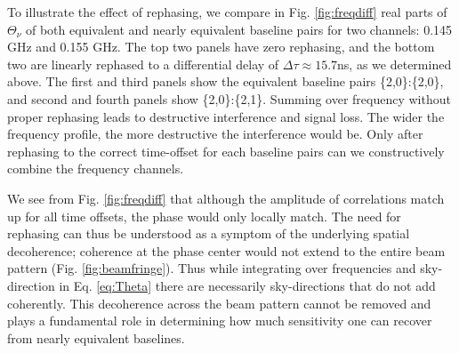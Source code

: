 \documentclass[twocolumn,apj,numberedappendix]{emulateapj}
\renewcommand\[{\begin{equation}}
\renewcommand\]{\end{equation}}
\begin{document}
To illustrate the effect of rephasing, we compare in Fig. \ref{fig:freqdiff} real parts of $\Theta_{\nu}$ of both equivalent and nearly equivalent baseline pairs for two channels: 0.145 GHz and 0.155 GHz. The top two panels have zero rephasing, and the bottom two are linearly rephased to a differential delay of $\Delta\tau\approx15.7$ns, as we determined above. The first and third panels show the equivalent baseline pairs \{2,0\}:\{2,0\}, and second and fourth panels show \{2,0\}:\{2,1\}. Summing over frequency without proper rephasing leads to destructive interference and signal loss. The wider the frequency profile, the more destructive the interference would be. Only after rephasing to the correct time-offset for each baseline pairs can we constructively combine the frequency channels. 

We see from Fig. \ref{fig:freqdiff} that although the amplitude of correlations match up for all time offsets, the phase would only locally match. The need for rephasing can thus be understood as a symptom of the underlying spatial decoherence; coherence at the phase center would not extend to the entire beam pattern (Fig. \ref{fig:beamfringe}). Thus while integrating over frequencies and sky-direction in Eq. \eqref{eq:Theta} there are necessarily sky-directions that do not add coherently. This decoherence across the beam pattern cannot be removed and plays a fundamental role in determining how much sensitivity one can recover from nearly equivalent baselines. 
\end{document}
